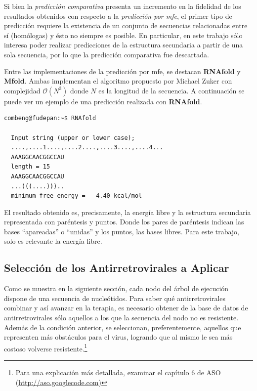 Si bien la \textit{predicci\'on comparativa} presenta un incremento en la fidelidad de los resultados obtenidos con respecto a la \textit{predicci\'on
por mfe}, el primer tipo de predicci\'on requiere la existencia de un conjunto de secuencias relacionadas entre s\'i (hom\'ologas) y \'esto no siempre
es posible. En particular, en este trabajo s\'olo interesa poder realizar predicciones de la estructura secundaria a partir de una sola secuencia, por
lo que la predicci\'on comparativa fue descartada.

Entre las implementaciones de la predicci\'on por mfe, se destacan \textbf{RNAfold}\cite{Hofacker94} y \textbf{Mfold}. Ambas implementan el algoritmo propuesto por Michael
Zuker con complejidad $\mathcal{O}(N^{3})$ donde $N$ es la longitud de la secuencia.
A continuaci\'on se puede ver un ejemplo de una predicci\'on realizada con \textbf{RNAfold}.

\begin{verbatim}
combeng@fudepan:~$ RNAfold

  Input string (upper or lower case); 
  ....,....1....,....2....,....3....,....4...
  AAAGGCAACGGCCAU
  length = 15
  AAAGGCAACGGCCAU
  ...(((....)))..
  minimum free energy =  -4.40 kcal/mol
\end{verbatim}

El resultado obtenido es, precisamente, la energ\'ia libre y la estructura secundaria representada con par\'entesis y puntos. Donde los pares de
par\'entesis indican las bases ``apareadas'' o ``unidas'' y los puntos, las bases libres. Para este trabajo, solo es relevante la energ\'ia libre.

\subsection{Selecci\'on de los Antirretrovirales a Aplicar}
  Como se muestra en la siguiente secci\'on, cada nodo del \'arbol de ejecuci\'on dispone de una secuencia de nucle\'otidos. Para saber qu\'e 
  antirretrovirales combinar y as\'i avanzar en la terapia, es necesario obtener de la base de datos de antirretrovirales s\'olo aquellos a los que
  la secuencia del nodo no es resistente. Adem\'as de la condici\'on anterior, se seleccionan, preferentemente, aquellos que representen m\'as
  obst\'aculos para el virus, logrando que al mismo le sea m\'as costoso volverse resistente.\footnote{Para una explicaci\'on m\'as detallada,
  examinar el cap\'itulo 6 de ASO (\url{http://aso.googlecode.com})}
\newpage
